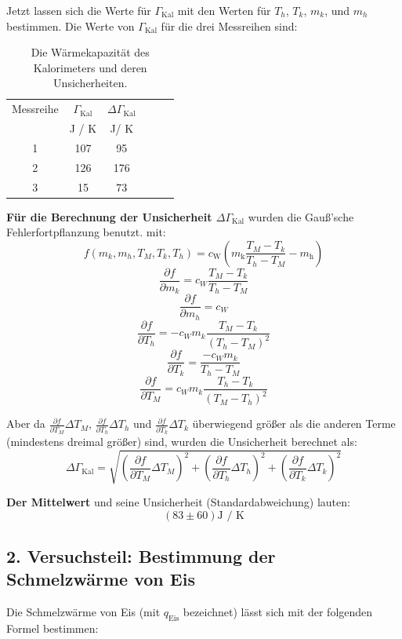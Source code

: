 \documentclass[11pt,a4paper]{article} %
\begin{document}
\newpage	

Jetzt lassen sich die Werte für $\Gamma_\textrm{Kal}$ mit den Werten für $T_h$, $T_k$, $m_k$, und $m_h$ bestimmen. Die Werte von $\Gamma_\textrm{Kal}$ für die drei Messreihen sind:

\begin{table}[h]
	\centering
	\begin{tabular*}{0.99\textwidth}{@{\extracolsep{\fill}}cccccc}
		\toprule
		Messreihe & $\Gamma_\textrm{Kal}$ & $\Delta \Gamma_\textrm{Kal}$  \\
		& J / K & J/ K\\
		\bottomrule
		1 & 107 & 95  \\
		2 & 126 & 176 \\
		3 & 15 & 73 \\
		\bottomrule
	\end{tabular*}
	\caption{Die Wärmekapazität des Kalorimeters und deren Unsicherheiten.}
	\label{tabelle3}
\end{table}

\textbf{Für die Berechnung der Unsicherheit $\Delta \Gamma_\textrm{Kal}$} wurden die Gauß'sche Fehlerfortpflanzung benutzt.  mit:
$$f(m_k, m_h, T_M, T_k, T_h) = c_\textrm{W}(m_\textrm{k} \frac{T_M-T_k}{T_h-T_M} -m_\textrm{h}) $$
$$ \frac{\partial f}{\partial m_k} = c_W\frac{T_M-T_k}{T_h-T_M}$$
$$ \frac{\partial f}{\partial m_h} = c_W$$
$$ \frac{\partial f}{\partial T_h} = -c_W m_k \frac{T_M - T_k}{(T_h-T_M)^2} $$
$$ \frac{\partial f}{\partial T_k} = \frac{-c_W m_k}{T_h-T_M} $$
$$ \frac{\partial f}{\partial T_M} = c_W m_k \frac{T_h-T_k}{(T_M-T_h)^2} $$

Aber da $\frac{\partial f}{\partial T_M} \Delta T_M$, $\frac{\partial f}{\partial T_h} 
\Delta T_h$ und $\frac{\partial f}{\partial T_k} \Delta T_k$ überwiegend größer als die anderen Terme 
(mindestens dreimal größer) sind, wurden die Unsicherheit berechnet als:
$$\Delta \Gamma_\textrm{Kal} = \sqrt{(\frac{\partial f}{\partial T_M} \Delta T_M)^2+(\frac{\partial f}{\partial T_h} \Delta T_h)^2+(\frac{\partial f}{\partial T_k} \Delta T_k)^2 }$$


\textbf{Der Mittelwert} und seine Unsicherheit (Standardabweichung) lauten:
$$(83 \pm 60 ) \textrm{J / K}$$

\subsection{2. Versuchsteil: Bestimmung der Schmelzwärme von Eis}

Die Schmelzwärme von Eis (mit $q_\textrm{Eis}$ bezeichnet) lässt sich mit der folgenden Formel bestimmen:
\end{document}
